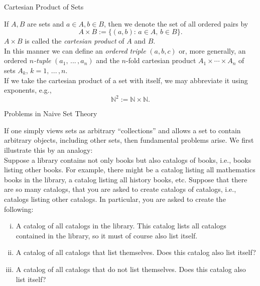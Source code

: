 \documentclass[smaller,hyperref={CJKbookmarks=true}]{beamer}
\newcommand{\N}{\mathbb{N}} \newcommand{\Z}{\mathbb{Z}} \newcommand{\Q}{\mathbb{Q}}
\begin{document}
\begin{frame}[c]{Cartesian Product of Sets}
\begin{spacing}{1.1}
If $A,B$ are sets and $a\in A,b\in B$, then we denote the set of all ordered pairs by
\[A\times B:=\{(a,b)\!:\,a\in A,\,b\in B\}.\]
$A\times B$ is called the \emph{cartesian product} of $A$ and $B$.\\[5pt]
In this manner we can define an \emph{ordered triple} $(a,b,c)$ or, more generally, an ordered \emph{$n$-tuple} $(a_1,\,...\,,a_n)$ and the $n$-fold cartesian product $A_1\times\cdots\times A_n$ of sets $A_k,\,k=1,\,...\,,n$.\\[4pt]
If we take the cartesian product of a set with itself, we may abbreviate it
using exponents, e.g.,
\[\N^2:=\N\times\N.\]
\end{spacing}
\end{frame}
\begin{frame}[t]{Problems in Naive Set Theory}
\begin{spacing}{1.05}
If one simply views sets as arbitrary ``collections'' and allows a set to
contain arbitrary objects, including other sets, then fundamental problems
arise. We first illustrate this by an analogy:\\[4pt]
Suppose a library contains not only books but also catalogs of books, i.e.,
books listing other books. For example, there might be a catalog listing all
mathematics books in the library, a catalog listing all history books, etc.
Suppose that there are so many catalogs, that you are asked to create
catalogs of catalogs, i.e., catalogs listing other catalogs. In particular, you
are asked to create the following:
\begin{enumerate}[(i)]
  \item \alert{A catalog of all catalogs in the library.} This catalog lists all catalogs contained in the library, so it must of course also list itself.
  \item \alert{A catalog of all catalogs that list themselves.} Does this catalog also list itself?
  \item \alert{A catalog of all catalogs that do not list themselves.} Does this catalog also list itself?
\end{enumerate}
\end{spacing}
\end{frame}
\end{document}
